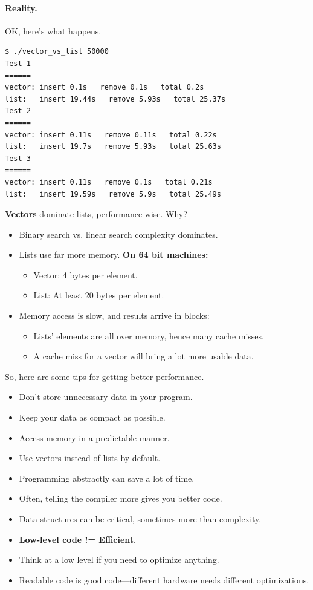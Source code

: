 \documentclass[a4paper]{report}
\begin{document}
\paragraph{Reality.} OK, here's what happens. 
\begin{verbatim}
$ ./vector_vs_list 50000
Test 1
======
vector: insert 0.1s   remove 0.1s   total 0.2s
list:   insert 19.44s   remove 5.93s   total 25.37s
Test 2
======
vector: insert 0.11s   remove 0.11s   total 0.22s
list:   insert 19.7s   remove 5.93s   total 25.63s
Test 3
======
vector: insert 0.11s   remove 0.1s   total 0.21s
list:   insert 19.59s   remove 5.9s   total 25.49s
\end{verbatim}

{\bf Vectors} dominate lists, performance wise. Why?
  \begin{itemize}
    \item Binary search vs. linear search complexity dominates.
    \item Lists use far more memory.
      {\bf On 64 bit machines:}
      \begin{itemize}
        \item Vector: 4 bytes per element.
        \item List: At least 20 bytes per element.
      \end{itemize}
    \item Memory access is slow, and results arrive in blocks:
      \begin{itemize}
        \item Lists' elements are all over memory, hence many
          cache misses.
        \item A cache miss for a vector will bring a lot more usable data.
      \end{itemize}
  \end{itemize}

So, here are some tips for getting better performance.
  \begin{itemize}
    \item Don't store unnecessary data in your program.
    \item Keep your data as compact as possible.
    \item Access memory in a predictable manner.
    \item Use vectors instead of lists by default.
    \item Programming abstractly can save a lot of time.
    \item Often, telling the compiler more gives you better code.
    \item Data structures can be critical, sometimes more than complexity.
    \item {\bf Low-level code != Efficient}.
    \item Think at a low level if you need to optimize anything.
    \item Readable code is good code---different hardware needs different
      optimizations.
  \end{itemize}
\end{document}
